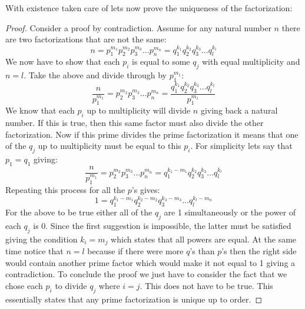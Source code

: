 \documentclass[12pt, letterpaper, onecolumn, conference, final]{IEEEtran}
\theoremstyle{definition}
\theoremstyle{plain}
\begin{document}
\noindent
With existence taken care of lets now prove the uniqueness of the factorization:
\begin{proof}
Consider a proof by contradiction. Assume for any natural number $n$ there are two factorizations that are not the same:
\begin{equation*}
n = p_1^{m_1} p_2^{m_2} p_3^{m_3} \dots p_n^{m_n} = q_1^{k_1} q_2^{k_2} q_3^{k_3} \dots q_l^{k_l}
\end{equation*}
We now have to show that each $p_i$ is equal to some $q_j$ with equal multiplicity and $n = l$. Take the above and divide through by $p_1^{m_1}$:
\begin{equation*}
\frac{n}{p_1^{m_1}} = p_2^{m_2} p_3^{m_3} \dots p_n^{m_n} = \frac{q_1^{k_1} q_2^{k_2} q_3^{k_3} \dots q_l^{k_l}}{p_1^{m_1}}
\end{equation*}
We know that each $p_i$ up to multiplicity will divide $n$ giving back a natural number. If this is true, then this same factor must also divide the other factorization. Now if this prime divides the prime factorization it means that one of the $q_j$ up to multiplicity must be equal to this $p_i$. For simplicity lets say that $p_1 = q_1$ giving:
\begin{equation*}
\frac{n}{p_1^{m_1}} = p_2^{m_2} p_3^{m_3} \dots p_n^{m_n} = q_1^{k_1-m_1} q_2^{k_2} q_3^{k_3} \dots q_l^{k_l}
\end{equation*}
Repeating this process for all the $p$'s gives:
\begin{equation*}
1 = q_1^{k_1-m_1} q_2^{k_2-m_2} q_3^{k_3-m_3} \dots q_l^{k_l-m_n}
\end{equation*}
For the above to be true either all of the $q_j$ are 1 simultaneously or the power of each $q_j$ is 0. Since the first suggestion is impossible, the latter must be satisfied giving the condition $k_i = m_j$ which states that all powers are equal. At the same time notice that $n = l$ because if there were more $q$'s than $p$'s then the right side would contain another prime factor which would make it not equal to 1 giving a contradiction. To conclude the proof we just have to consider the fact that we chose each $p_i$ to divide $q_j$ where $i = j$. This does not have to be true. This essentially states that any prime factorization is unique up to order.
\end{proof}
\end{document}
